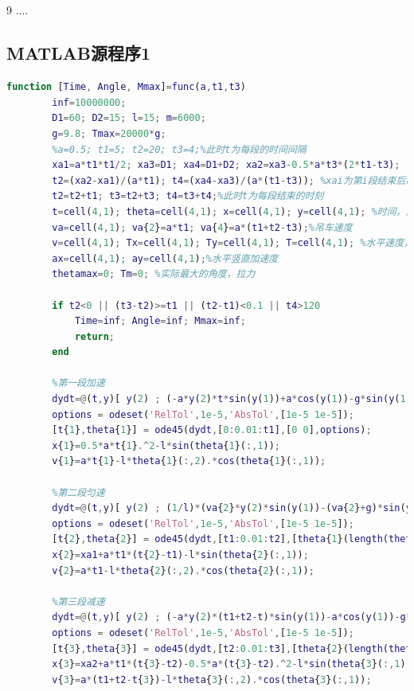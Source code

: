 \documentclass[withoutpreface,bwprint]{cumcmthesis} %
\begin{document}
\subsection{}
\begin{thebibliography}{9}%
     ....
\end{thebibliography}
\begin{appendices}
    \section{MATLAB源程序1}

    \begin{lstlisting}[language=matlab]
        function [Time, Angle, Mmax]=func(a,t1,t3)
        inf=10000000;
        D1=60; D2=15; l=15; m=6000;
        g=9.8; Tmax=20000*g;
        %a=0.5; t1=5; t2=20; t3=4;%此时t为每段的时间间隔
        xa1=a*t1*t1/2; xa3=D1; xa4=D1+D2; xa2=xa3-0.5*a*t3*(2*t1-t3);
        t2=(xa2-xa1)/(a*t1); t4=(xa4-xa3)/(a*(t1-t3)); %xai为第i段结束后吊车的位移
        t2=t2+t1; t3=t2+t3; t4=t3+t4;%此时t为每段结束的时刻
        t=cell(4,1); theta=cell(4,1); x=cell(4,1); y=cell(4,1); %时间，角度，横纵坐标
        va=cell(4,1); va{2}=a*t1; va{4}=a*(t1+t2-t3);%吊车速度
        v=cell(4,1); Tx=cell(4,1); Ty=cell(4,1); T=cell(4,1); %水平速度，拉力,
        ax=cell(4,1); ay=cell(4,1);%水平竖直加速度
        thetamax=0; Tm=0; %实际最大的角度，拉力
        
        if t2<0 || (t3-t2)>=t1 || (t2-t1)<0.1 || t4>120
            Time=inf; Angle=inf; Mmax=inf;
            return;
        end
        
        %第一段加速
        dydt=@(t,y)[ y(2) ; (-a*y(2)*t*sin(y(1))+a*cos(y(1))-g*sin(y(1)))/l ];
        options = odeset('RelTol',1e-5,'AbsTol',[1e-5 1e-5]);
        [t{1},theta{1}] = ode45(dydt,[0:0.01:t1],[0 0],options);
        x{1}=0.5*a*t{1}.^2-l*sin(theta{1}(:,1));
        v{1}=a*t{1}-l*theta{1}(:,2).*cos(theta{1}(:,1));
        
        %第二段匀速
        dydt=@(t,y)[ y(2) ; (1/l)*(va{2}*y(2)*sin(y(1))-(va{2}+g)*sin(y(1))) ];
        options = odeset('RelTol',1e-5,'AbsTol',[1e-5 1e-5]);
        [t{2},theta{2}] = ode45(dydt,[t1:0.01:t2],[theta{1}(length(theta{1}(:,1)),1) theta{1}(length(theta{1}(:,2)),2)],options);
        x{2}=xa1+a*t1*(t{2}-t1)-l*sin(theta{2}(:,1));
        v{2}=a*t1-l*theta{2}(:,2).*cos(theta{2}(:,1));
        
        %第三段减速
        dydt=@(t,y)[ y(2) ; (-a*y(2)*(t1+t2-t)*sin(y(1))-a*cos(y(1))-g*sin(y(1)))/l ];
        options = odeset('RelTol',1e-5,'AbsTol',[1e-5 1e-5]);
        [t{3},theta{3}] = ode45(dydt,[t2:0.01:t3],[theta{2}(length(theta{2}(:,1)),1) theta{2}(length(theta{2}(:,2)),2)],options);
        x{3}=xa2+a*t1*(t{3}-t2)-0.5*a*(t{3}-t2).^2-l*sin(theta{3}(:,1));
        v{3}=a*(t1+t2-t{3})-l*theta{3}(:,2).*cos(theta{3}(:,1));
        

\end{lstlisting}
\end{appendices}
\end{document}
